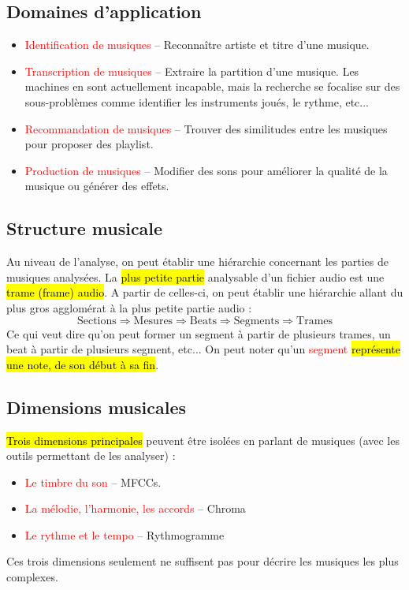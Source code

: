 \documentclass[letterpaper, 12pt]{article}
\newcommand{\alinea}{
\hspace*{0.5cm}}
\newcommand{\red}[1]{
	\textcolor{red}{#1}}
\begin{document}
		\subsection{Domaines d'application}
			\begin{itemize}
				\setlength\itemsep{0cm}
				\item \red{Identification de musiques} -- Reconnaître artiste et titre d'une musique.
				\item \red{Transcription de musiques} -- Extraire la partition d'une musique. Les machines en sont actuellement 
					incapable, mais la recherche se focalise sur des sous-problèmes comme identifier les instruments joués, le rythme, etc...
				\item \red{Recommandation de musiques} -- Trouver des similitudes entre les musiques pour proposer des playlist.
				\item \red{Production de musiques} -- Modifier des sons pour améliorer la qualité de la musique ou générer des effets.
			\end{itemize}
		\subsection{Structure musicale}
			\alinea Au niveau de l'analyse, on peut établir une hiérarchie concernant les parties de musiques analysées.
				La \hl{plus petite partie} analysable d'un fichier audio est une \hl{trame (frame) audio}. 
				A partir de celles-ci, on peut établir une hiérarchie allant du plus gros agglomérat à la plus petite partie audio : 
				$$ \text{Sections} \Rightarrow \text{Mesures} \Rightarrow  \text{Beats} 
				        \Rightarrow \text{Segments} \Rightarrow \text{Trames} $$
				Ce qui veut dire qu'on peut former un segment à partir de plusieurs trames, un beat à partir de plusieurs segment, etc...
				On peut noter qu'un \red{segment} \hl{représente une note, de son début à sa fin}.
		\subsection{Dimensions musicales}
			\alinea \hl{Trois dimensions principales} peuvent être isolées en parlant de musiques 
				(avec les outils permettant de les analyser) : 
			\begin{itemize}
				\setlength\itemsep{0cm}
				\item \red{Le timbre du son} -- MFCCs.
				\item \red{La mélodie, l'harmonie, les accords} -- Chroma
				\item \red{Le rythme et le tempo} -- Rythmogramme
			\end{itemize}
			Ces trois dimensions seulement ne suffisent pas pour décrire les musiques les plus complexes.
\end{document}
